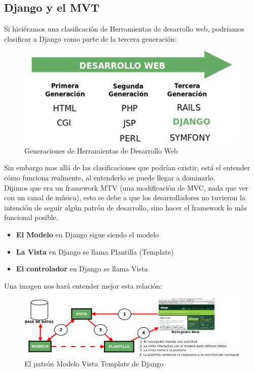 \subsection{Django y el MVT}

Si hiciéramos una clasificación de Herramientas de desarrollo web, podríamos clasificar a Django como parte de la tercera generación:


\begin{figure}[h]
    \centering
    \includegraphics[scale=0.7]{resourse/desarrolloweb.png}
    \caption{Generaciones de Herramientas de Desarrollo Web}
    \label{fig:02}
\end{figure}   

Sin embargo mas allá de las clasificaciones que podrían existir, está el entender cómo funciona realmente, al entenderlo se puede llegar a dominarlo. \\[0.1cm]

Dijimos que era un framework MTV (una modificación de MVC, nada que ver con un canal de música), esto se debe a que los desarrolladores no tuvieron la  intención de seguir algún patrón de desarrollo, sino hacer el framework lo más funcional posible.

\begin{itemize}
    \item {\bfseries  El Modelo} en Django sigue siendo el modelo
    \item {\bfseries La Vista} en Django se llama Plantilla (Template)
    \item {\bfseries El controlador} en Django se llama Vista
\end{itemize}

Una imagen nos hará entender mejor esta relación:

\begin{figure}[h]
    \centering
    \includegraphics[scale=0.5]{resourse/esquema-mtv.png}
    \caption{El patrón Modelo Vista Template de Django}
    \label{fig:04}
\end{figure}   



